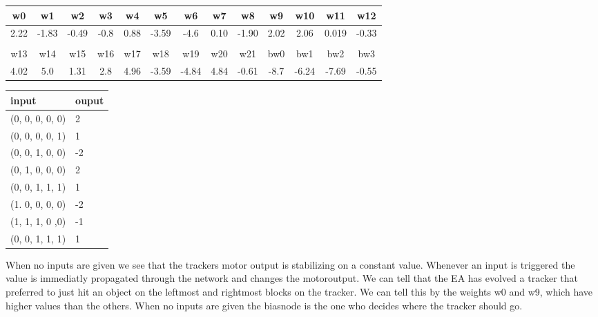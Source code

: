 \begin{tabular}{c | c | c | c | c | c | c | c | c | c | c | c | c }

w0  & w1  & w2  & w3  & w4  & w5  & w6  & w7  & w8  & w9  & w10 & w11 & w12 \\
\hline
2.22 & -1.83 & -0.49 & -0.8 & 0.88 & -3.59 & -4.6 & 0.10 & -1.90 & 2.02 & 2.06 & 0.019 & -0.33 \\ \\

w13 & w14 & w15 & w16 & w17 & w18 & w19 & w20 & w21 & bw0 & bw1 & bw2 & bw3 \\
\hline
4.02 & 5.0 & 1.31 & 2.8 & 4.96 & -3.59 & -4.84 & 4.84 & -0.61 & -8.7 & -6.24 & -7.69 & -0.55 \\

\end{tabular}



\begin{tabular}{l | l}
	input & ouput \\ \hline
	(0, 0, 0, 0, 0) & 2 \\
    (0, 0, 0, 0, 1) & 1  \\
    (0, 0, 1, 0, 0) & -2 \\
    (0, 1, 0, 0, 0) & 2 \\
    (0, 0, 1, 1, 1) & 1  \\
    (1. 0, 0, 0, 0) & -2 \\
    (1, 1, 1, 0 ,0) & -1 \\
    (0, 0, 1, 1, 1) & 1  \\
\end{tabular}


When no inputs are given we see that the trackers motor output is stabilizing on a constant value. Whenever an input is triggered the value is immediatly propagated through the network and changes the motoroutput. We can tell that the EA has evolved a tracker that preferred to just hit an object on the leftmost and rightmost blocks on the tracker. We can tell this by the weights w0 and w9, which have higher values than the others. When no inputs are given the biasnode is the one who decides where the tracker should go.



